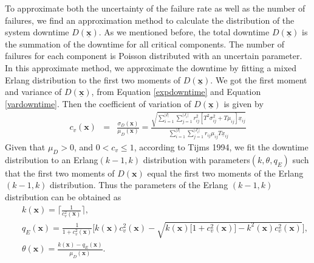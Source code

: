 \documentclass[preprint,12pt]{elsarticle}
\begin{document}
To approximate both the uncertainty of the failure rate as well as the number of failures, we find an approximation method to calculate the distribution of the system downtime $D(\underline{\boldsymbol{x}})$. As we mentioned before, the total downtime $D(\underline{\boldsymbol{x}})$ is the summation of the downtime for all critical components. The number of failures for each component is Poisson distributed with an uncertain parameter. In this approximate method, we approximate the downtime by fitting a mixed Erlang distribution to the first two moments of $D(\underline{\boldsymbol{x}})$. We got the first moment and variance of $D(\underline{\boldsymbol{x}})$, from Equation \eqref{expdowntime} and Equation \eqref{vardowntime}. Then the coefficient of variation of $D(\underline{\boldsymbol{x}})$ is given by
\small
\begin{eqnarray}
c_{v}(\boldsymbol{x}) &=& \frac{\sigma_{D}(\boldsymbol{x})}{\mu_{D}(\boldsymbol{x})} = \frac{\sqrt{\sum_{i=1}^{\lvert I \rvert}\sum_{j=1}^{\lvert J_{i} \rvert}r_{ij}^{2}[T^{2}\sigma^{2}_{ij}+T\mu_{ij}]\underline{x}_{ij}}}{\sum^{\lvert I \rvert}_{i=1} \sum_{j=1}^{\lvert J_{i} \rvert}{r_{ij}\mu_{ij}T\underline{x}_{ij}}} \label{cv}
\end{eqnarray}
\normalsize
Given that $\mu_{D}>0$, and $0<c_{v}\leq 1$, according to Tijms 1994, we fit the downtime distribution to an Erlang$(k-1,k)$ distribution with parameters$(k,\theta,q_{E})$ such that the first two moments of $D(\boldsymbol{x})$ equal the first two moments of the Erlang $(k-1,k)$ distribution. Thus the parameters of the Erlang $(k-1,k)$ distribution can be obtained as
\small
\begin{eqnarray}
&&k(\boldsymbol{x}) = \lceil \frac{1}{c_{v}^{2}(\boldsymbol{x})} \rceil, \label{k1}\\
&&q_{E}(\boldsymbol{x})= \frac{1}{1+c^{2}_{v}(\boldsymbol{x})}\bigg[k(\boldsymbol{x})c^{2}_{v}(\boldsymbol{x})-\sqrt{k(\boldsymbol{x})\big[1+c^{2}_{v}(\boldsymbol{x})\big]-k^{2}(\boldsymbol{x})c^{2}_{v}(\boldsymbol{x})} \bigg], \label{q1}\\
&&\theta(\boldsymbol{x}) = \frac{k(\boldsymbol{x})-q_{E}(\boldsymbol{x})}{\mu_{D}(\boldsymbol{x})}. \label{theta1}
\end{eqnarray}
\end{document}
